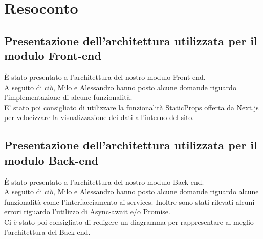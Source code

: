 \section{Resoconto}
\subsection{Presentazione dell'architettura utilizzata per il modulo Front-end}

È stato presentato a \Proponente{} l'architettura del nostro modulo Front-end. \\A seguito di ciò, Milo e Alessandro hanno posto alcune domande riguardo l'implementazione di alcune funzionalità.\\E' stato poi consigliato di utilizzare la funzionalità StaticProps offerta da Next.js per velocizzare la visualizzazione dei dati all'interno del sito.

\subsection{Presentazione dell'architettura utilizzata per il modulo Back-end}

È stato presentato a \Proponente{} l'architettura del nostro modulo Back-end. \\A seguito di ciò, Milo e Alessandro hanno posto alcune domande riguardo alcune funzionalità come l'interfacciamento ai services. Inoltre sono stati rilevati alcuni errori riguardo l'utilizzo di Async-await e/o Promise. \\Ci è stato poi consigliato di redigere un diagramma per rappresentare al meglio l'architettura del Back-end.
